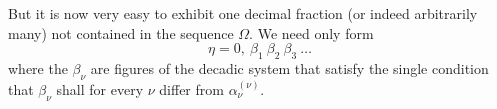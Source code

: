But it is now very easy to exhibit one decimal fraction (or indeed arbitrarily many) not contained in the sequence $\Omega$. We need only form
\[
\eta = 0,\ \beta_1\ \beta_2\ \beta_3\ \dots
\]
where the $\beta_\nu$ are figures of the decadic system that satisfy the single condition that $\beta_\nu$ shall for every $\nu$ differ from $\alpha_\nu^{(\nu)}$.
